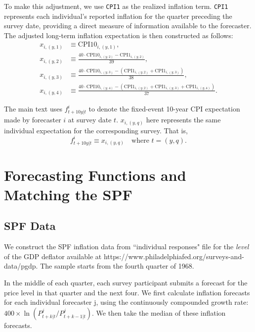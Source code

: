 \documentclass[12pt,letter,leqno]{article}
\theoremstyle{asn}
\theoremstyle{lem}
\theoremstyle{slem}
\theoremstyle{prop}
\theoremstyle{appprop}
\theoremstyle{rem}
\theoremstyle{defn}
\begin{document}
  To make this adjustment, we use \texttt{CPI1} as the realized inflation term. \texttt{CPI1} represents each individual's reported inflation for the quarter preceding the survey date, providing a direct measure of information available to the forecaster. The adjusted long-term inflation expectation is then constructed as follows:
  \begin{align}
  x_{i,(y,1)} &\equiv \text{CPI10}_{i,(y,1)}, \\
  x_{i,(y,2)} &\equiv
   \frac{40\cdot\text{CPI10}_{i,(y,2)} - \text{CPI1}_{i,(y,2)}}{39}, \\
  x_{i,(y,3)} &\equiv
   \frac{40\cdot\text{CPI10}_{i,(y,3)}
   - \left(\text{CPI1}_{i,(y,2)} + \text{CPI1}_{i,(y,3)}\right)}{38}, \\
  x_{i,(y,4)} &\equiv
   \frac{40\cdot\text{CPI10}_{i,(y,4)}
   - \left(\text{CPI1}_{i,(y,2)} + \text{CPI1}_{i,(y,3)}
   + \text{CPI1}_{i,(y,4)}\right)}{37}.
  \end{align}
  
  The main text uses $f_{t+10y|t}^{i}$ to denote the fixed-event 10-year CPI expectation made by forecaster $i$ at survey date $t$. $x_{i,(y, q)}$ here represents the same individual expectation for the corresponding survey. That is,
  \[
  f_{t+10y|t}^{i} \equiv x_{i,(y, q)} \quad \text{where } t = (y, q).
  \]
  
  




\section{Forecasting Functions and Matching the SPF}\label{appsec:SPF}

\renewcommand{\theequation}{C\arabic{equation}}


\subsection{SPF Data}\label{appsec:SPFdata}
We construct the SPF inflation data from ``individual responses" file for the \textit{level} of the GDP deflator available at https://www.philadelphiafed.org/surveys-and-data/pgdp. The sample starts from the fourth quarter of 1968.

In the middle of each quarter, each survey participant submits a forecast for the price level in that quarter and the next four. We first calculate inflation forecasts for each individual forecaster j, using the continuously compounded growth rate: $400\times\ln(P^j_{t+k|t}/P^j_{t+k-1|t})$. We then take the median of these inflation forecasts.
\end{document}
